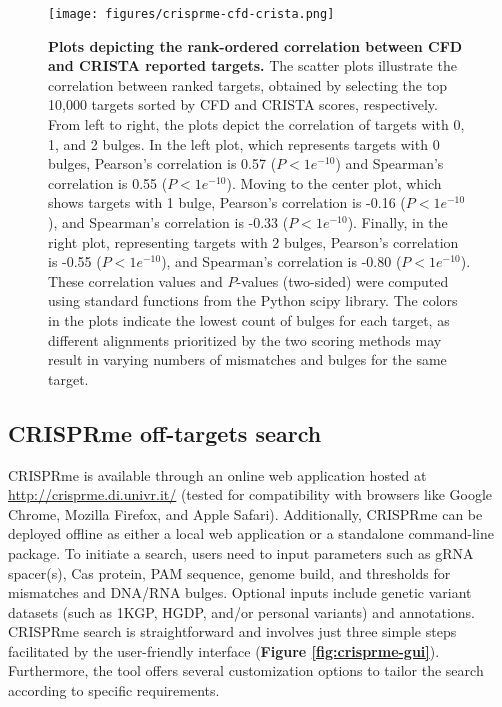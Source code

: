 \documentclass[a4paper, titlepage, openright]{book}
\newcommand{\crisprme}{CRISPRme\xspace}
\begin{document}
\begin{figure}[!]
	\centering
	\texttt{[image: figures/crisprme-cfd-crista.png]}
	\caption[Plots depicting the rank-ordered correlation between CFD and CRISTA reported targets]{\textbf{Plots depicting the rank-ordered correlation between CFD and CRISTA reported targets.} The scatter plots illustrate the correlation between ranked targets, obtained by selecting the top 10,000 targets sorted by CFD and CRISTA scores, respectively. From left to right, the plots depict the correlation of targets with 0, 1, and 2 bulges. In the left plot, which represents targets with 0 bulges, Pearson's correlation is 0.57 ($P < 1e^{-10}$) and Spearman's correlation is 0.55 ($P < 1e^{-10}$). Moving to the center plot, which shows targets with 1 bulge, Pearson's correlation is -0.16 ($P < 1e^{-10}$), and Spearman's correlation is -0.33 ($P < 1e^{-10}$). Finally, in the right plot, representing targets with 2 bulges, Pearson's correlation is -0.55 ($P < 1e^{-10}$), and Spearman's correlation is -0.80 ($P < 1e^{-10}$). These correlation values and $P$-values (two-sided) were computed using standard functions from the Python scipy library. The colors in the plots indicate the lowest count of bulges for each target, as different alignments prioritized by the two scoring methods may result in varying numbers of mismatches and bulges for the same target.\\ \hfill}
	\label{fig:crisprme-cfd-crista}
\end{figure}

\subsection{CRISPRme off-targets search}
CRISPRme is available through an online web application hosted at \url{http://crisprme.di.univr.it/} (tested for compatibility with browsers like Google Chrome, Mozilla Firefox, and Apple Safari). Additionally, \crisprme can be deployed offline as either a local web application or a standalone command-line package. To initiate a search, users need to input parameters such as gRNA spacer(s), Cas protein, PAM sequence, genome build, and thresholds for mismatches and DNA/RNA bulges. Optional inputs include genetic variant datasets (such as 1KGP, HGDP, and/or personal variants) and annotations. \crisprme search is straightforward and involves just three simple steps facilitated by the user-friendly interface (\textbf{Figure \ref{fig:crisprme-gui}}). Furthermore, the tool offers several customization options to tailor the search according to specific requirements.
\end{document}
